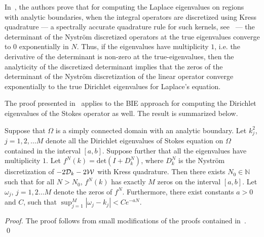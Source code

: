 In~\cite{zhao2015robust}, the authors prove that
for computing the Laplace eigenvalues on regions with 
analytic boundaries, when the integral operators are
discretized using Kress quadrature --- a spectrally accurate
quadrature rule for such kernels, see~\cite{kress1991boundary} ---
the determinant of the Nystr\"{o}m discretized operators
at the true eigenvalues converge to $0$ exponentially
in $N$.
Thus, if the eigenvalues have multiplicity $1$,
i.e. the derivative of the determinant is non-zero
at the true-eigenvalues, then the analyticity of the
discretized determinant implies that the zeros
of the determinant of the Nystr\"{o}m discretization
of the linear operator converge exponentially to
the true Dirichlet eigenvalues for Laplace's equation.

The proof presented in~\cite{zhao2015robust} applies
to the BIE approach for computing the Dirichlet eigenvalues
of the Stokes operator as well.
The result is summarized below.
\begin{theorem}
\label{thm:mainconvfreddet}
Suppose that $\Omega$ is a simply connected
domain with an analytic boundary. Let $k_{j}^2$, $j=1,2,\ldots M$
denote all the Dirichlet eigenvalues of Stokes equation
on $\Omega$ contained in the interval $[a,b]$. 
Suppose further that all the eigenvalues have multiplicity $1$.
Let $f^{N}(k) = \text{det}(I+D^{N}_{k})$, where $D^{N}_{k}$ 
is the Nystr\"{o}m discretization of $-2{\mathcal D}_{k} - 2{\mathcal W}$ with Kress
quadrature.
Then there exists $N_{0} \in \mathbb{N}$ such
that for all $N>N_{0}$, 
$f^{N}(k)$ has exactly $M$ zeros on the interval $[a,b]$.
Let $\omega_{j}$, $j=1,2\ldots M$ denote the zeros of $f^{N}$.
Furthermore, there exist constants $a>0$ and $C$, 
such that $\sup_{j=1}^{M} |\omega_{j} - k_{j}| < C e^{-aN}$.
\end{theorem}

\begin{proof}
  The proof follows from small modifications of the
  proofs contained in~\cite{zhao2015robust}. 
\qed
\end{proof}

